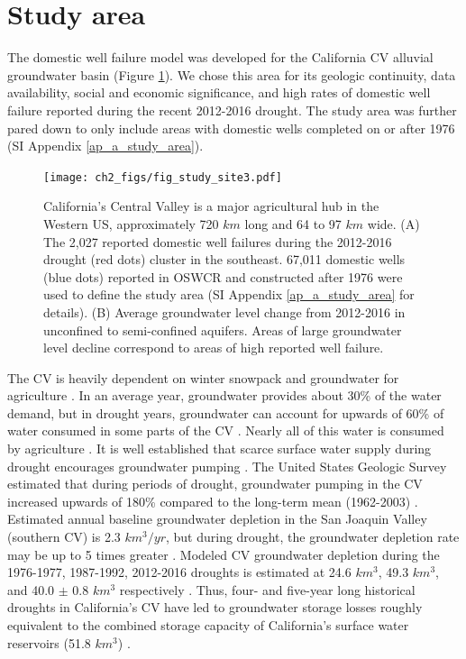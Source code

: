 \section{Study area}

The domestic well failure model was developed for the California CV alluvial groundwater basin (Figure \ref{fig:study_site}). We chose this area for its geologic continuity, data availability, social and economic significance, and high rates of domestic well failure reported during the recent 2012-2016 drought. The study area was further pared down to only include areas with domestic wells completed on or after 1976 (SI Appendix \ref{ap_a_study_area}).  

\begin{figure}%
	\centering
	\texttt{[image: ch2\_figs/fig\_study\_site3.pdf]}
	\caption{California's Central Valley is a major agricultural hub in the Western US, approximately 720 $km$ long and 64 to 97 $km$ wide. (A) The 2,027 reported domestic well failures during the 2012-2016 drought (red dots) cluster in the southeast. 67,011 domestic wells (blue dots) reported in OSWCR and constructed after 1976 were used to define the study area (SI Appendix \ref{ap_a_study_area} for details). (B) Average groundwater level change from 2012-2016 in unconfined to semi-confined aquifers. Areas of large groundwater level decline correspond to areas of high reported well failure.}
	\label{fig:study_site}
\end{figure}

The CV is heavily dependent on winter snowpack and groundwater for agriculture \citep{Scanlon2012, Faunted.2009, Hanak2011}. 
In an average year, groundwater provides about 30\% of the water demand, but in drought years, groundwater can account for upwards of 60\% of water consumed in some parts of the CV \citep{Brush2013}. Nearly all of this water is consumed by agriculture \citep{Brush2013, Faunted.2009}. 
It is well established that scarce surface water supply during drought encourages groundwater pumping \citep{Lund2018, Feinstein2017, Mount2018}. The United States Geologic Survey estimated that during periods of drought, groundwater pumping in the CV increased upwards of 180\% compared to the long-term mean (1962-2003) \citep{Faunted.2009}. 
Estimated annual baseline groundwater depletion in the San Joaquin Valley (southern CV) is 2.3 $km^3/yr$, but during drought, the groundwater depletion rate may be up to 5 times greater \citep{Hanak2019}. 
Modeled CV groundwater depletion during the 1976-1977, 1987-1992, 2012-2016 droughts is estimated at 24.6 $km^3$, 49.3 $km^3$, and 40.0 $\pm$ 0.8 $km^3$ respectively \citep{Scanlon2012, Xiao2017}.
Thus, four- and five-year long historical droughts in California's CV have led to groundwater storage losses roughly equivalent to the combined storage capacity of California's surface water reservoirs (51.8 $km^3$) \citep{Hanak2011}.  

